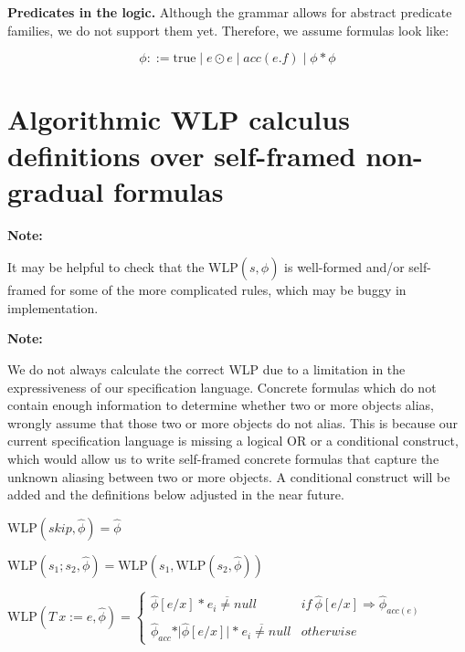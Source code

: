 \documentclass {article}
\newcommand{\true}{\text{true}}
\newcommand{\fphi}{\widehat{\phi}}
\newcommand{\imp}{\Rightarrow}
\newcommand{\wlp}[2]{\text{WLP}(#1,#2)}
\begin{document}
\textbf{Predicates in the logic.} Although the grammar allows for abstract predicate families, we do not support them yet. Therefore, we assume formulas look like:

$$ \phi ::= \true \mid e \odot e \mid acc(e.f) \mid \phi \ast \phi $$

\section{Algorithmic WLP calculus definitions over self-framed non-gradual formulas}
\hspace{0.5cm}

\textbf{Note:} 

It may be helpful to check that the $\wlp{s}{\fphi}$ is well-formed and/or self-framed for some of the more complicated rules, which may be buggy in implementation.

\vspace{0.5cm}

\textbf{Note:}

We do not always calculate the correct WLP due to a limitation in the expressiveness of our specification language. Concrete formulas which do not contain enough information to determine whether two or more objects alias, wrongly assume that those two or more objects do not alias. This is because our current specification language is missing a logical OR or a conditional construct, which would allow us to write self-framed concrete formulas that capture the unknown aliasing between two or more objects. A conditional construct will be added and the definitions below adjusted in the near future.

\vspace{0.5cm}

$\wlp{skip}{\fphi} = \fphi  $

\vspace{0.5cm}

$\wlp{s_1;s_2}{\fphi} = \wlp{s_1}{\wlp{s_2}{\fphi}} $

\vspace{0.5cm}

$\wlp{T \ x := e}{\fphi} = 
	\begin{cases}
	 \fphi[e/x] \ \overline{\ast \ e_i \neq null} & if \ \fphi[e/x] \imp \fphi_{acc(e)} \\
	 \fphi_{acc} \ast \vert \fphi[e/x] \vert \ \overline{\ast \ e_i \neq null} & otherwise
	\end{cases} $
	
\end{document}
